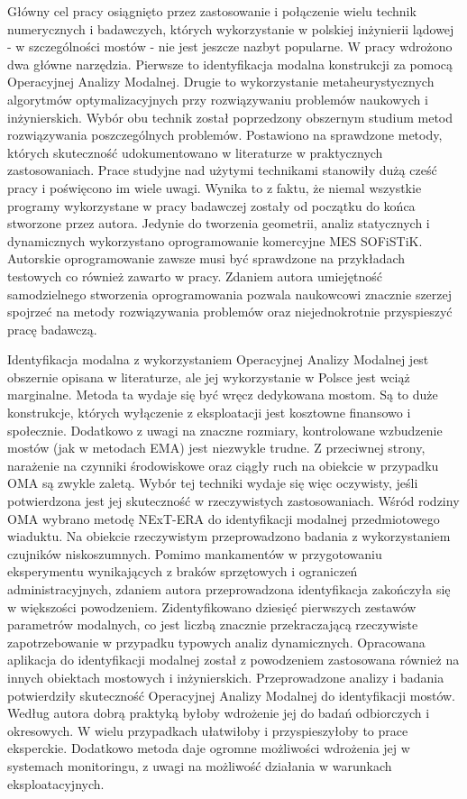 Główny cel pracy osiągnięto przez zastosowanie i połączenie wielu technik numerycznych i badawczych, których wykorzystanie w polskiej inżynierii lądowej - w szczególności mostów - nie jest jeszcze nazbyt popularne. W pracy wdrożono dwa główne narzędzia. Pierwsze to identyfikacja modalna konstrukcji za pomocą Operacyjnej Analizy Modalnej. Drugie to wykorzystanie metaheurystycznych algorytmów optymalizacyjnych przy rozwiązywaniu problemów naukowych i inżynierskich. Wybór obu technik został poprzedzony obszernym studium metod rozwiązywania poszczególnych problemów. Postawiono na sprawdzone metody, których skuteczność udokumentowano w literaturze w praktycznych zastosowaniach. Prace studyjne nad użytymi technikami stanowiły dużą cześć pracy i poświęcono im wiele uwagi. Wynika to z faktu, że niemal wszystkie programy wykorzystane w pracy badawczej zostały od początku do końca stworzone przez autora. Jedynie do tworzenia geometrii, analiz statycznych i dynamicznych wykorzystano oprogramowanie komercyjne MES SOFiSTiK. Autorskie oprogramowanie zawsze musi być sprawdzone na przykładach testowych co również zawarto w pracy. Zdaniem autora umiejętność samodzielnego stworzenia oprogramowania pozwala naukowcowi znacznie szerzej spojrzeć na metody rozwiązywania problemów oraz niejednokrotnie przyspieszyć pracę badawczą.

Identyfikacja modalna z wykorzystaniem Operacyjnej Analizy Modalnej jest obszernie opisana w literaturze, ale jej wykorzystanie w Polsce jest wciąż marginalne. Metoda ta wydaje się być wręcz dedykowana mostom. Są to duże konstrukcje, których wyłączenie z eksploatacji jest kosztowne finansowo i społecznie. Dodatkowo z uwagi na znaczne rozmiary, kontrolowane wzbudzenie mostów (jak w metodach EMA) jest niezwykle trudne. Z przeciwnej strony, narażenie na czynniki środowiskowe oraz ciągły ruch na obiekcie w przypadku OMA są zwykle zaletą. Wybór tej techniki wydaje się więc oczywisty, jeśli potwierdzona jest jej skuteczność w rzeczywistych zastosowaniach. Wśród rodziny OMA wybrano metodę NExT-ERA do identyfikacji modalnej przedmiotowego wiaduktu. Na obiekcie rzeczywistym przeprowadzono badania z wykorzystaniem czujników niskoszumnych. Pomimo mankamentów w przygotowaniu eksperymentu wynikających z braków sprzętowych i ograniczeń administracyjnych, zdaniem autora przeprowadzona identyfikacja zakończyła się w większości powodzeniem. Zidentyfikowano dziesięć pierwszych zestawów parametrów modalnych, co jest liczbą znacznie przekraczającą rzeczywiste zapotrzebowanie w przypadku typowych analiz dynamicznych. Opracowana aplikacja do identyfikacji modalnej został z powodzeniem zastosowana również na innych obiektach mostowych i inżynierskich. Przeprowadzone analizy i badania potwierdziły skuteczność Operacyjnej Analizy Modalnej do identyfikacji mostów. Według autora dobrą praktyką byłoby wdrożenie jej do badań odbiorczych i okresowych. W wielu przypadkach ułatwiłoby i przyspieszyłoby to prace eksperckie. Dodatkowo metoda daje ogromne możliwości wdrożenia jej w systemach monitoringu, z uwagi na możliwość działania w warunkach eksploatacyjnych.


